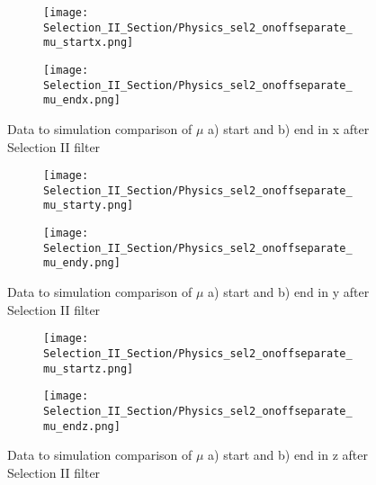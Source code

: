 \documentclass{article}
\begin{document}
\begin{figure}[t!]
\centering
  \begin{subfigure}[t]{0.3\textwidth}
    \centering
\texttt{[image: Selection\_II\_Section/Physics\_sel2\_onoffseparate\_mu\_startx.png]}
   \caption{ }
  \end{subfigure} 
  \hspace{30 mm}
  \begin{subfigure}[t]{0.3\textwidth}
    \centering
\texttt{[image: Selection\_II\_Section/Physics\_sel2\_onoffseparate\_mu\_endx.png]}
   \caption{ }
  \end{subfigure} 
\caption{ Data to simulation comparison of $\mu$ a) start and b) end in x after Selection II filter }
\label{fig:physics_sel2_x}
\end{figure}

\begin{figure}[t!]
\centering
  \begin{subfigure}[t]{0.3\textwidth}
    \centering
\texttt{[image: Selection\_II\_Section/Physics\_sel2\_onoffseparate\_mu\_starty.png]}
   \caption{ }
  \end{subfigure} 
  \hspace{30 mm}
  \begin{subfigure}[t]{0.3\textwidth}
    \centering
\texttt{[image: Selection\_II\_Section/Physics\_sel2\_onoffseparate\_mu\_endy.png]}
   \caption{ }
  \end{subfigure} 
\caption{ Data to simulation comparison of $\mu$ a) start and b) end in y after Selection II filter }
\label{fig:physics_sel2_y}
\end{figure}

\begin{figure}[t!]
\centering
  \begin{subfigure}[t]{0.3\textwidth}
    \centering
\texttt{[image: Selection\_II\_Section/Physics\_sel2\_onoffseparate\_mu\_startz.png]}
   \caption{ }
  \end{subfigure} 
  \hspace{30mm}
  \begin{subfigure}[t]{0.3\textwidth}
    \centering
\texttt{[image: Selection\_II\_Section/Physics\_sel2\_onoffseparate\_mu\_endz.png]}
   \caption{ }
  \end{subfigure} 

\caption{ Data to simulation comparison of $\mu$ a) start and b) end in z after Selection II filter }
\label{fig:physics_sel2_z}
\end{figure}
\end{document}
